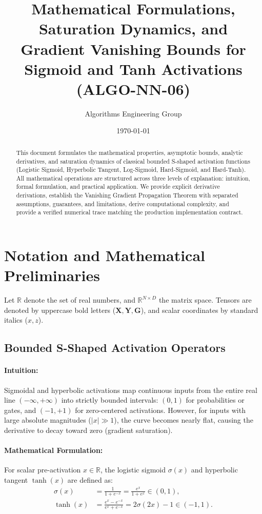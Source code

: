 \documentclass[11pt]{article}
\title{Mathematical Formulations, Saturation Dynamics, and Gradient Vanishing Bounds for Sigmoid and Tanh Activations (ALGO-NN-06)}
\author{Algorithms Engineering Group}
\date{\today}
\begin{document}
\maketitle

\begin{abstract}
This document formulates the mathematical properties, asymptotic bounds, analytic derivatives, and saturation dynamics of classical bounded S-shaped activation functions (Logistic Sigmoid, Hyperbolic Tangent, Log-Sigmoid, Hard-Sigmoid, and Hard-Tanh). All mathematical operations are structured across three levels of explanation: intuition, formal formulation, and practical application. We provide explicit derivative derivations, establish the Vanishing Gradient Propagation Theorem with separated assumptions, guarantees, and limitations, derive computational complexity, and provide a verified numerical trace matching the production implementation contract.
\end{abstract}

\section{Notation and Mathematical Preliminaries}
\label{sec:notation}

Let $\mathbb{R}$ denote the set of real numbers, and $\mathbb{R}^{N \times D}$ the matrix space. Tensors are denoted by uppercase bold letters ($\mathbf{X}, \mathbf{Y}, \mathbf{G}$), and scalar coordinates by standard italics ($x, z$).

\subsection{Bounded S-Shaped Activation Operators}
\paragraph{Intuition:} Sigmoidal and hyperbolic activations map continuous inputs from the entire real line $(-\infty, +\infty)$ into strictly bounded intervals: $(0, 1)$ for probabilities or gates, and $(-1, +1)$ for zero-centered activations. However, for inputs with large absolute magnitudes ($|x| \gg 1$), the curve becomes nearly flat, causing the derivative to decay toward zero (gradient saturation).

\paragraph{Mathematical Formulation:}
For scalar pre-activation $x \in \mathbb{R}$, the logistic sigmoid $\sigma(x)$ and hyperbolic tangent $\tanh(x)$ are defined as:
\begin{align}
\sigma(x) &= \frac{1}{1 + e^{-x}} = \frac{e^x}{1 + e^x} \in (0, 1), \label{eq:sigmoid_def} \\
\tanh(x) &= \frac{e^x - e^{-x}}{e^x + e^{-x}} = 2\sigma(2x) - 1 \in (-1, 1). \label{eq:tanh_def}
\end{align}
\end{document}
